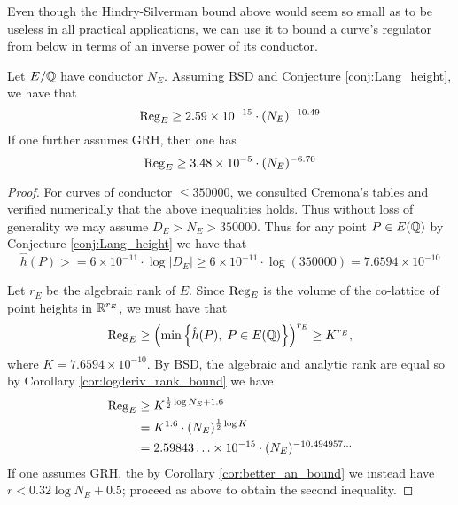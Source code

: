 Even though the Hindry-Silverman bound above would seem so small as to be useless in all practical applications, we can use it to bound a curve's regulator from below in terms of an inverse power of its conductor.
\begin{theorem}\label{thm:regulator_lower_bound}
Let $E/\mathbb{Q}$ have conductor $N_E$. Assuming BSD and Conjecture \ref{conj:Lang_height}, we have that
\begin{equation}
\operatorname{Reg}_E \ge 2.59 \times 10^{-15} \cdot (N_E)^{-10.49}
\end{equation}
If one further assumes GRH, then one has
\begin{equation}
\operatorname{Reg}_E \ge 3.48 \times 10^{-5} \cdot (N_E)^{-6.70}
\end{equation}
\end{theorem}
\begin{proof}
For curves of conductor $\le 350000$, we consulted Cremona's tables and verified numerically that the above inequalities holds. Thus without loss of generality we may assume $D_E > N_E > 350000$. Thus for any point $P \in E(\mathbb{Q})$ by Conjecture \ref{conj:Lang_height} we have that
\begin{equation}
\hat{h}(P) >= 6\times10^{-11} \cdot \log |D_E| \ge 6\times10^{-11} \cdot \log(350000) = 7.6594 \times 10^{-10}
\end{equation}

Let $r_E$ be the algebraic rank of $E$. Since $\operatorname{Reg}_E$ is the volume of the co-lattice of point heights in $\mathbb{R}^{r_E}$, we must have that
\begin{equation*}
\operatorname{Reg}_E \ge \left(\min \left\{ \hat{h}(P), \; P \in E(\mathbb{Q})\right\}\right)^{r_E} \ge  K^{r_E},
\end{equation*}
where $K = 7.6594 \times 10^{-10}$. By BSD, the algebraic and analytic rank are equal so by Corollary \ref{cor:logderiv_rank_bound} we have
\begin{align*}
\operatorname{Reg}_E &\ge K^{\frac{1}{2} \log N_E + 1.6} \\
&= K^{1.6} \cdot (N_E)^{\frac{1}{2} \log K} \\
&= 2.59843\ldots \times 10^{-15} \cdot (N_E)^{-10.494957\ldots}
\end{align*}
If one assumes GRH, the by Corollary \ref{cor:better_an_bound} we instead have $r < 0.32 \log N_E + 0.5$; proceed as above to obtain the second inequality.
\end{proof}

